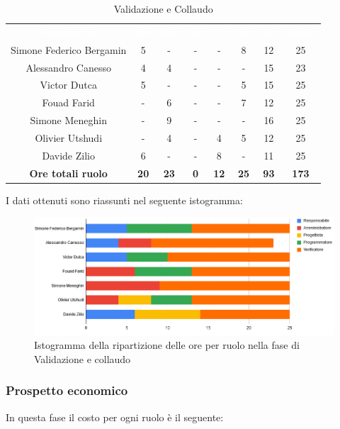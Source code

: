\begin{table}[H]
\centering\renewcommand{\arraystretch}{1.5}
\caption{Validazione e Collaudo}
\vspace{0.2cm}
\begin{tabular}{ c | c | c | c | c | c | c | c }
\rowcolor{redafk}
\textcolor{white}{\textbf{Nominativo}} & \textcolor{white}{\textbf{Re}} & 
\textcolor{white}{\textbf{Am}} & \textcolor{white}{\textbf{An}} &
\textcolor{white}{\textbf{Pt}} & \textcolor{white}{\textbf{Pm}} &
\textcolor{white}{\textbf{Ve}} & \textcolor{white}{\textbf{Totale}} \\
Simone Federico Bergamin 	& 5 	& - 	& - 	& - 	& 8 	& 12 	& 25 \\
Alessandro Canesso 			& 4 	& 4 	& - 	& - 	& - 	& 15 	& 23 \\
Victor Dutca 				& 5 	& - 	& - 	& - 	& 5 	& 15 	& 25 \\
Fouad Farid					& - 	& 6 	& - 	& - 	& 7 	& 12 	& 25 \\
Simone Meneghin 			& - 	& 9 	& - 	& - 	& - 	& 16 	& 25 \\
Olivier Utshudi 			& - 	& 4 	& - 	& 4 	& 5 	& 12 	& 25 \\
Davide Zilio 				& 6 	& - 	& - 	& 8 	& - 	& 11 	& 25 \\
\rowcolor{lastrowcolor}
\textbf{Ore totali ruolo} & \textbf{20} & \textbf{23} & \textbf{0} & \textbf{12} & \textbf{25} & \textbf{93} & \textbf{173} \\
\end{tabular}
\end{table}

I dati ottenuti sono riassunti nel seguente istogramma: 
\begin{figure}[H]
\centering
\includegraphics[scale=0.60]{img/grafici/tabella_fase_val_col.png}
\caption{Istogramma della ripartizione delle ore per ruolo nella fase di Validazione e collaudo}
\end{figure}

\subsubsection{Prospetto economico}
In questa fase il costo per ogni ruolo è il seguente:

